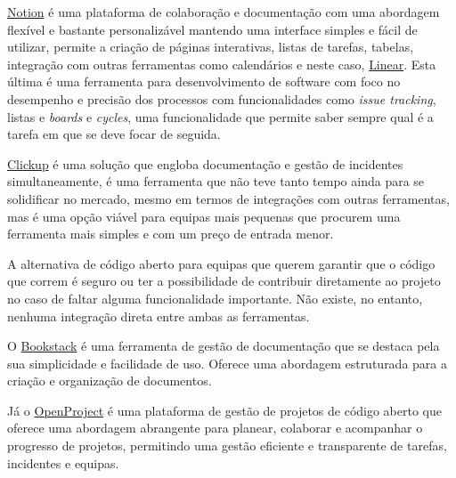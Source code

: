 
            \label{linear-notion}

                \href{https://www.notion.so/}{Notion} é uma plataforma de colaboração e documentação com uma abordagem flexível e bastante personalizável mantendo uma interface simples e fácil de utilizar, permite a criação de páginas interativas, listas de tarefas, tabelas, integração com outras ferramentas como calendários e neste caso, \href{https://linear.app/}{Linear}. Esta última é uma ferramenta para desenvolvimento de software com foco no desempenho e precisão dos processos com funcionalidades como \textit{issue tracking}, listas e \textit{boards} e \textit{cycles}, uma funcionalidade que permite saber sempre qual é a tarefa em que se deve focar de seguida.
                
            \label{clickup}
            
                \href{https://clickup.com/}{Clickup} é uma solução que engloba documentação e gestão de incidentes simultaneamente, é uma ferramenta que não teve tanto tempo ainda para se solidificar no mercado, mesmo em termos de integrações com outras ferramentas, mas é uma opção viável para equipas mais pequenas que procurem uma ferramenta mais simples e com um preço de entrada menor\cite{clickup-vs-jira}.

            \label{bookstack}
            
                A alternativa de código aberto para equipas que querem garantir que o código que correm é seguro ou ter a possibilidade de contribuir diretamente ao projeto no caso de faltar alguma funcionalidade importante. Não existe, no entanto, nenhuma integração direta entre ambas as ferramentas.
                
                O \href{https://www.bookstackapp.com/}{Bookstack} é uma ferramenta de gestão de documentação que se destaca pela sua simplicidade e facilidade de uso. Oferece uma abordagem estruturada para a criação e organização de documentos.

                Já o \href{https://www.openproject.org/}{OpenProject} é uma plataforma de gestão de projetos de código aberto que oferece uma abordagem abrangente para planear, colaborar e acompanhar o progresso de projetos, permitindo uma gestão eficiente e transparente de tarefas, incidentes e equipas.